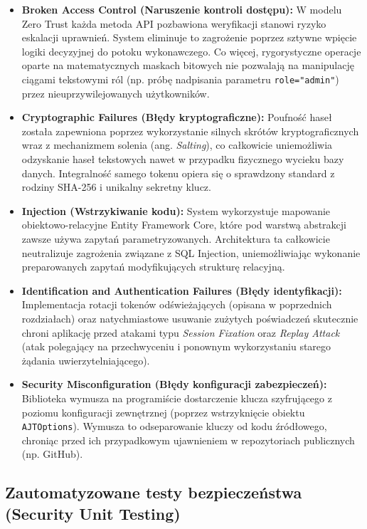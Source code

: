 \documentclass{SGGW-thesis}
\begin{document}
\begin{itemize}
    \item \textbf{Broken Access Control (Naruszenie kontroli dostępu):} W modelu Zero Trust każda metoda API pozbawiona weryfikacji stanowi ryzyko eskalacji uprawnień. System eliminuje to zagrożenie poprzez sztywne wpięcie logiki decyzyjnej do potoku wykonawczego. Co więcej, rygorystyczne operacje oparte na matematycznych maskach bitowych nie pozwalają na manipulację ciągami tekstowymi ról (np. próbę nadpisania parametru \texttt{role="admin"}) przez nieuprzywilejowanych użytkowników.
    \item \textbf{Cryptographic Failures (Błędy kryptograficzne):} Poufność haseł została zapewniona poprzez wykorzystanie silnych skrótów kryptograficznych wraz z mechanizmem solenia (ang. \textit{Salting}), co całkowicie uniemożliwia odzyskanie haseł tekstowych nawet w przypadku fizycznego wycieku bazy danych. Integralność samego tokenu opiera się o sprawdzony standard z rodziny SHA-256 i unikalny sekretny klucz.
    \item \textbf{Injection (Wstrzykiwanie kodu):} System wykorzystuje mapowanie obiektowo-relacyjne Entity Framework Core, które pod warstwą abstrakcji zawsze używa zapytań parametryzowanych. Architektura ta całkowicie neutralizuje zagrożenia związane z SQL Injection, uniemożliwiając wykonanie preparowanych zapytań modyfikujących strukturę relacyjną.
    \item \textbf{Identification and Authentication Failures (Błędy identyfikacji):} Implementacja rotacji tokenów odświeżających (opisana w poprzednich rozdziałach) oraz natychmiastowe usuwanie zużytych poświadczeń skutecznie chroni aplikację przed atakami typu \textit{Session Fixation} oraz \textit{Replay Attack} (atak polegający na przechwyceniu i ponownym wykorzystaniu starego żądania uwierzytelniającego).
    \item \textbf{Security Misconfiguration (Błędy konfiguracji zabezpieczeń):} Biblioteka wymusza na programiście dostarczenie klucza szyfrującego z poziomu konfiguracji zewnętrznej (poprzez wstrzyknięcie obiektu \texttt{AJTOptions}). Wymusza to odseparowanie kluczy od kodu źródłowego, chroniąc przed ich przypadkowym ujawnieniem w repozytoriach publicznych (np. GitHub).
\end{itemize}

\subsection{Zautomatyzowane testy bezpieczeństwa (Security Unit Testing)}
\end{document}
